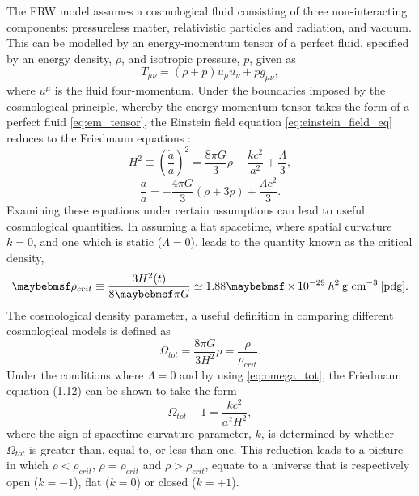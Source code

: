 The FRW model assumes a cosmological fluid consisting of three non-interacting components: pressureless matter, relativistic particles and radiation, and vacuum. This can be modelled by an energy-momentum tensor of a perfect fluid, specified by an energy density, $\rho$, and isotropic pressure, $p$, given as 
%
\begin{equation}\label{eq:em_tensor}
  T_{\mu\nu} = (\rho + p)u_{\mu}u_{\nu} + pg_{\mu\nu}, 
\end{equation}
%
where $u^{\mu}$ is the fluid four-momentum. Under the boundaries imposed by the cosmological principle, whereby the energy-momentum tensor takes the form of a perfect fluid \ref{eq:em_tensor}, the Einstein field equation \ref{eq:einstein_field_eq} reduces to the Friedmann equations \cite{Friedman, SeanC}:
%
\begin{equation}
  H^2 \equiv \left( \frac{\dot{a}}{a} \right)^2 = \frac{8\pi{}G}{3}\rho - \frac{kc^2}{a^2} + \frac{\Lambda}{3},
\end{equation}
%
%
\begin{equation}\label{eq:friedmann_2}
    \frac{\ddot{a}}{a} = -\frac{4\pi{}G}{3}(\rho + 3p) + \frac{\Lambda{}c^2}{3}.
\end{equation}
%
Examining these equations under certain assumptions can lead to useful cosmological quantities. In assuming a flat spacetime, where spatial curvature $k=0$, and one which is static ($\Lambda = 0$), leads to the quantity known as the critical density, 
%
\begin{equation}\label{eq:crit_density}
  \rho_{crit} \equiv \frac{3H^2(t)}{8\pi{}G} \simeq 1.88 \times 10^{-29} \: h^2 \: \MathText{g cm}^{-3} \: \cite{pdg}.
\end{equation}
%
The cosmological density parameter, a useful definition in comparing different cosmological models is defined as
%
\begin{equation}\label{eq:omega_tot}
  \Omega_{tot} = \frac{8\pi{}G}{3H^2}\rho = \frac{\rho}{\rho_{crit}}.
\end{equation}
%
Under the conditions where $\Lambda = 0$ and by using \ref{eq:omega_tot}, the Friedmann equation (1.12) can be shown to take the form
%
\begin{equation}\label{eq:density_param}
  \Omega_{tot} - 1 = \frac{kc^2}{a^2H^2}, 
\end{equation}
%
where the sign of spacetime curvature parameter, $k$, is determined by whether $\Omega_{tot}$ is greater than, equal to, or less than one. This reduction leads to a picture in which $\rho < \rho_{crit}$, $\rho = \rho_{crit}$ and $\rho > \rho_{crit}$, equate to a universe that is respectively open ($k=-1$), flat ($k=0$) or closed ($k=+1$). 

